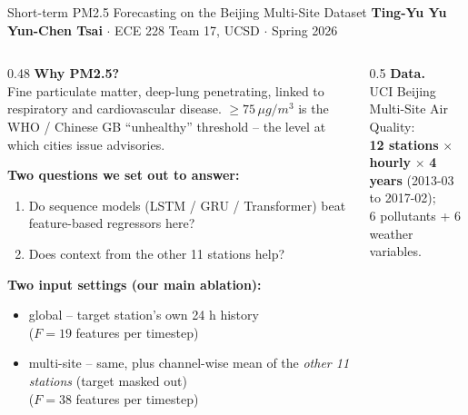 \documentclass[10pt,aspectratio=169]{beamer}
\begin{document}
\begin{frame}{Short-term PM2.5 Forecasting on the Beijing Multi-Site Dataset}
\vspace{-0.5em}
\centering\footnotesize
\textbf{Ting-Yu Yu} \quad \textbf{Yun-Chen Tsai} \quad $\cdot$ \quad ECE 228 Team 17, UCSD \quad $\cdot$ \quad Spring 2026

\vspace{0.6em}
\begin{columns}[T,onlytextwidth]
\begin{column}{0.48\linewidth}
\small
\textbf{Why PM2.5?}\\
Fine particulate matter, deep-lung penetrating, linked to
respiratory and cardiovascular disease.
\alert{$\geq 75\,\mu g/m^3$} is the WHO / Chinese GB
``unhealthy'' threshold -- the level at which cities issue advisories.

\vspace{0.8em}
\textbf{Two questions we set out to answer:}
\begin{enumerate}\setlength\itemsep{0.15em}
  \item Do \alert{sequence models} (LSTM / GRU / Transformer)
        beat feature-based regressors here?
  \item Does \alert{context from the other 11 stations} help?
\end{enumerate}

\vspace{0.8em}
\textbf{Two input settings (our main ablation):}
\begin{itemize}\setlength\itemsep{0.15em}
  \item \alert{global} -- target station's own 24 h history\\
        ($F{=}19$ features per timestep)
  \item \alert{multi-site} -- same, plus channel-wise mean of
        the \emph{other 11 stations} (target masked out)\\
        ($F{=}38$ features per timestep)
\end{itemize}
\end{column}
\begin{column}{0.5\linewidth}
\small
\textbf{Data.}\\
UCI Beijing Multi-Site Air Quality:\\
\textbf{12 stations} $\times$ \textbf{hourly} $\times$ \textbf{4 years}
(2013-03 to 2017-02);\\
6 pollutants + 6 weather variables.


\end{column}
\end{columns}
\end{frame}
\end{document}

